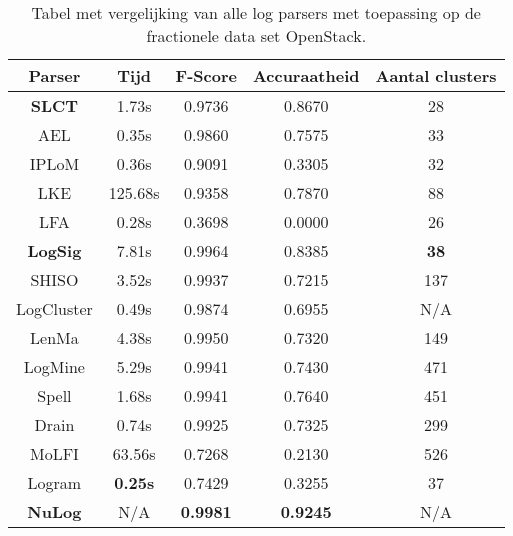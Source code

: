 \begin{table}[!htp]
    \caption{Tabel met vergelijking van alle log parsers met toepassing op de fractionele data set OpenStack.}
    \label{table:OpenStack}
    \begin{center}
        \begin{tabular}{||c | c | c | c | c||} 
            \hline
            Parser & Tijd & F-Score & Accuraatheid & Aantal clusters \\ [0.5ex] 
            \hline\hline
            \textbf{SLCT} & 1.73s & 0.9736 & 0.8670 & 28 \\
            
            AEL & 0.35s & 0.9860 & 0.7575 & 33 \\ 
            
            IPLoM & 0.36s & 0.9091 & 0.3305 & 32 \\
            
            LKE & 125.68s & 0.9358 & 0.7870 & 88 \\
            
            LFA & 0.28s & 0.3698 & 0.0000 & 26 \\
            
            \textbf{LogSig} & 7.81s & 0.9964 & 0.8385 & \textbf{38} \\
            
            SHISO & 3.52s & 0.9937 & 0.7215 & 137 \\
            
            LogCluster & 0.49s & 0.9874 & 0.6955 & N/A \\
            
            LenMa & 4.38s & 0.9950 & 0.7320 & 149 \\
            
            LogMine & 5.29s & 0.9941 & 0.7430 & 471 \\
            
            Spell & 1.68s & 0.9941 & 0.7640 & 451 \\
            
            Drain & 0.74s & 0.9925 & 0.7325 & 299 \\
            
            MoLFI & 63.56s & 0.7268 & 0.2130 & 526 \\
            
            Logram & \textbf{0.25s} & 0.7429 & 0.3255 & 37 \\
            
            \textbf{NuLog} & N/A & \textbf{0.9981} & \textbf{0.9245} & N/A \\
            \hline
        \end{tabular}
    \end{center}
\end{table}

